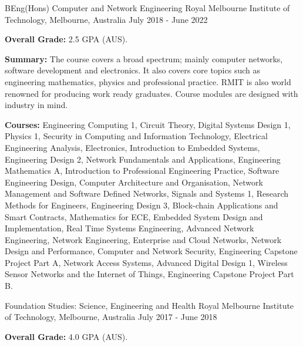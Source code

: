 

\begin{cventries}

  \cventry
    {BEng(Hons) Computer and Network Engineering} %
    {Royal Melbourne Institute of Technology, Melbourne, Australia} %
    {} %
    {July 2018 - June 2022} %
    {
      \begin{cvitems} %
        \item {\textbf{Overall Grade:} 2.5 GPA (AUS).}
        \item {\textbf{Summary:} The course covers a broad spectrum; mainly computer networks, software development and electronics. It also covers core topics such as engineering mathematics, physics and professional practice. RMIT is also world renowned for producing work ready graduates. Course modules are designed with industry in mind.}
        \item {\textbf{Courses:} Engineering Computing 1, Circuit Theory, Digital Systems Design 1, Physics 1, Security in Computing and Information Technology, Electrical Engineering Analysis, Electronics, Introduction to Embedded Systems, Engineering Design 2, Network Fundamentals and Applications, Engineering Mathematics A, Introduction to Professional Engineering Practice, Software Engineering Design, Computer Architecture and Organisation, Network Management and Software Defined Networks, Signals and Systems 1, Research Methods for Engineers, Engineering Design 3, Block-chain Applications and Smart Contracts, Mathematics for ECE, Embedded System Design and Implementation, Real Time Systems Engineering, Advanced Network Engineering, Network Engineering, Enterprise and Cloud Networks, Network Design and Performance, Computer and Network Security, Engineering Capstone Project Part A, Network Access Systems, Advanced Digital Design 1, Wireless Sensor Networks and the Internet of Things, Engineering Capstone Project Part B.}
      \end{cvitems}
    }
    
  \cventry
    {Foundation Studies: Science, Engineering and Health} %
    {Royal Melbourne Institute of Technology, Melbourne, Australia} %
    {} %
    {July 2017 - June 2018} %
    {
      \begin{cvitems} %
        \item {\textbf{Overall Grade:} 4.0 GPA (AUS).}
      \end{cvitems}
    }
    
  
\end{cventries}

